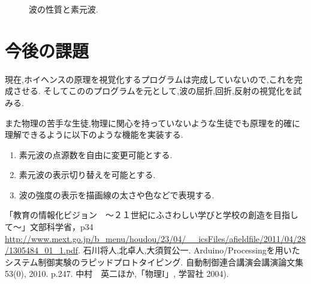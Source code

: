 \documentclass[a4j,twocolumn,uplatex]{jarticle}
\begin{document}
\begin{figure}[htbp]
\caption{{\footnotesize 波の性質と素元波.}}
\label{fig:thomson2clausius}
\end{figure}
\vspace{-7mm}

\section{今後の課題}
現在,ホイヘンスの原理を視覚化するプログラムは完成していないので,これを完成させる.
そしてこののプログラムを元として,波の屈折,回折,反射の視覚化を試みる.

また物理の苦手な生徒,物理に関心を持っていないような生徒でも原理を的確に理解できるように以下のような機能を実装する.
\begin{enumerate}
\item 素元波の点源数を自由に変更可能とする.
\item 素元波の表示切り替えを可能とする.
\item 波の強度の表示を描画線の太さや色などで表現する.
\end{enumerate}

\vspace{-5mm}
\begin{thebibliography}{9}
「教育の情報化ビジョン　〜２１世紀にふさわしい学びと学校の創造を目指して〜」文部科学省，p34 \url{http://www.mext.go.jp/b_menu/houdou/23/04/__icsFiles/afieldfile/2011/04/28/1305484_01_1.pdf}.
 石川将人,北卓人,大須賀公一. Arduino/Processingを用いたシステム制御実験のラピッドプロトタイピング. 自動制御連合講演会講演論文集 53(0), 2010. p.247.
 中村　英二ほか,「物理I」, 学習社 2004).


\end{thebibliography}
\end{document}
